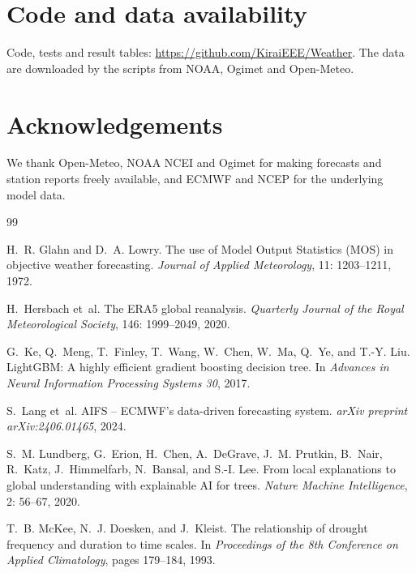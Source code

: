 \documentclass{article}
\begin{document}
\section*{Code and data availability}
Code, tests and result tables: \url{https://github.com/KiraiEEE/Weather}. The data are downloaded by the scripts from NOAA, Ogimet and Open-Meteo.

\section*{Acknowledgements}
We thank Open-Meteo, NOAA NCEI and Ogimet for making forecasts and station reports freely available, and ECMWF and NCEP for the underlying model data.

\begin{thebibliography}{99}
\small

H.~R. Glahn and D.~A. Lowry.
\newblock The use of Model Output Statistics (MOS) in objective weather forecasting.
\newblock \emph{Journal of Applied Meteorology}, 11: 1203--1211, 1972.

H.~Hersbach et~al.
\newblock The ERA5 global reanalysis.
\newblock \emph{Quarterly Journal of the Royal Meteorological Society}, 146: 1999--2049, 2020.

G.~Ke, Q.~Meng, T.~Finley, T.~Wang, W.~Chen, W.~Ma, Q.~Ye, and T.-Y. Liu.
\newblock LightGBM: A highly efficient gradient boosting decision tree.
\newblock In \emph{Advances in Neural Information Processing Systems 30}, 2017.

S.~Lang et~al.
\newblock AIFS -- ECMWF's data-driven forecasting system.
\newblock \emph{arXiv preprint arXiv:2406.01465}, 2024.

S.~M. Lundberg, G.~Erion, H.~Chen, A.~DeGrave, J.~M. Prutkin, B.~Nair, R.~Katz, J.~Himmelfarb, N.~Bansal, and S.-I. Lee.
\newblock From local explanations to global understanding with explainable AI for trees.
\newblock \emph{Nature Machine Intelligence}, 2: 56--67, 2020.

T.~B. McKee, N.~J. Doesken, and J.~Kleist.
\newblock The relationship of drought frequency and duration to time scales.
\newblock In \emph{Proceedings of the 8th Conference on Applied Climatology}, pages 179--184, 1993.


\end{thebibliography}
\end{document}
